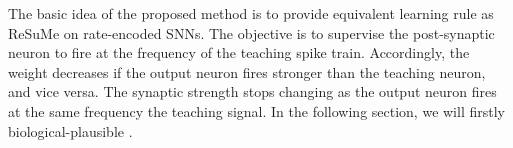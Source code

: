 The basic idea of the proposed method is to provide \DIFaddbegin {}\DIFaddend equivalent learning rule as ReSuMe on rate-encoded SNNs.
The objective is to supervise the post-synaptic neuron to fire at the frequency of the teaching spike train. 
Accordingly, the weight decreases if the output neuron fires stronger than the teaching neuron, and vice versa.
The synaptic strength stops changing as the output neuron fires at the same frequency \DIFdelbegin {}\DIFdelend \DIFaddbegin {}\DIFaddend the teaching signal.
In the following section, we will firstly \DIFdelbegin {}\DIFdelend \DIFaddbegin {}\DIFaddend biological-plausible \DIFdelbegin {}\DIFdelend \DIFaddbegin {}\DIFaddend .


